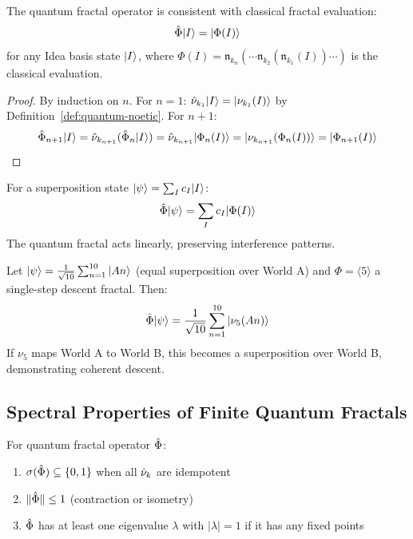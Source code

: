 \begin{proposition}
\label{prop:qc-fractal-consistency}
The quantum fractal operator is consistent with classical fractal evaluation:
\[
\hat{\Phi}|I\rangle = |\Phi(I)\rangle
\]
for any Idea basis state $|I\rangle$, where $\Phi(I) = \mathfrak{n}_{k_n}(\cdots \mathfrak{n}_{k_2}(\mathfrak{n}_{k_1}(I))\cdots)$ is the classical evaluation.
\end{proposition}

\begin{proof}
By induction on $n$. For $n = 1$: $\hat{\nu}_{k_1}|I\rangle = |\nu_{k_1}(I)\rangle$ by Definition~\ref{def:quantum-noetic}. For $n + 1$:
\[
\hat{\Phi}_{n+1}|I\rangle = \hat{\nu}_{k_{n+1}}(\hat{\Phi}_n|I\rangle) = \hat{\nu}_{k_{n+1}}|\Phi_n(I)\rangle = |\nu_{k_{n+1}}(\Phi_n(I))\rangle = |\Phi_{n+1}(I)\rangle
\]
\end{proof}

\begin{definition}
\label{def:qfractal-superposition}
For a superposition state $|\psi\rangle = \sum_I c_I |I\rangle$:
\[
\hat{\Phi}|\psi\rangle = \sum_I c_I |\Phi(I)\rangle
\]
The quantum fractal acts linearly, preserving interference patterns.
\end{definition}

\begin{example}
\label{ex:fractal-superposition}
Let $|\psi\rangle = \frac{1}{\sqrt{10}}\sum_{n=1}^{10}|An\rangle$ (equal superposition over World A) and $\Phi = \langle 5 \rangle$ a single-step descent fractal. Then:
\[
\hat{\Phi}|\psi\rangle = \frac{1}{\sqrt{10}}\sum_{n=1}^{10}|\nu_5(An)\rangle
\]
If $\nu_5$ maps World A to World B, this becomes a superposition over World B, demonstrating coherent descent.
\end{example}

\subsection{Spectral Properties of Finite Quantum Fractals}

\begin{theorem}
\label{thm:fractal-spectrum}
For quantum fractal operator $\hat{\Phi}$:
\begin{enumerate}
  \item $\sigma(\hat{\Phi}) \subseteq \{0, 1\}$ when all $\hat{\nu}_k$ are idempotent
  \item $\|\hat{\Phi}\| \leq 1$ (contraction or isometry)
  \item $\hat{\Phi}$ has at least one eigenvalue $\lambda$ with $|\lambda| = 1$ if it has any fixed points
\end{enumerate}
\end{theorem}

